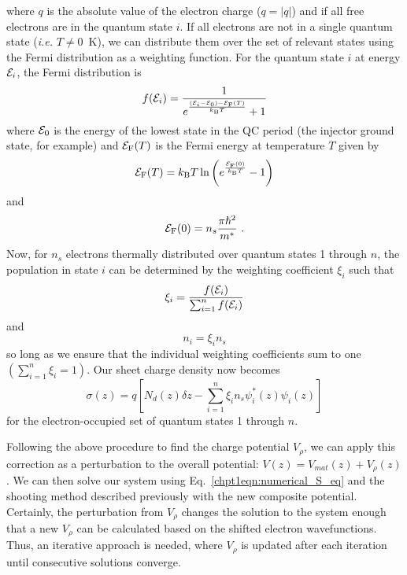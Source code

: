 \documentclass[12pt]{report}
\begin{document}
where $q$ is the absolute value of the electron charge ($q=|q|$) and if all free electrons are in the quantum state $i$.  If all electrons are not in a single quantum state (\emph{i.e.} $T\neq0$~K), we can distribute them over the set of relevant states using the Fermi distribution as a weighting function.  For the quantum state $i$ at energy $\EE_i$, the Fermi distribution is
\begin{equation}
f(\EE_i) = \frac{1}{e^{\frac{(\EE_i-\EE_0)-\EE_\tn{F}(T)}{k_\tn{B} T}}+1}
\end{equation}
where $\EE_0$ is the energy of the lowest state in the QC period (the injector ground state, for example) and $\EE_\tn{F}(T)$ is the Fermi energy at temperature $T$ given by \cite{Davies:book:1998}
\begin{equation}
\EE_\tn{F}(T)=k_\tn{B} T \ln\left(e^{\frac{\EE_\tn{F}(0)}{k_\tn{B} T}}-1\right)
\end{equation}
and
\begin{equation}
\EE_\tn{F}(0)=n_s \frac{\pi \hslash^2}{m^*} \text{~.}
\end{equation}
Now, for $n_s$ electrons thermally distributed over quantum states 1 through $n$, the population in state $i$ can be determined by the weighting coefficient $\xi_i$ such that
\begin{equation}
\xi_i = \frac{f(\EE_i)}{\sum_{i=1}^{n} f(\EE_i)}
\end{equation}
and
\begin{equation}
n_i=\xi_i n_s
\end{equation}
so long as we ensure that the individual weighting coefficients sum to one $\left(\sum_{i=1}^{n} \xi_i = 1\right)$.
Our sheet charge density now becomes
\begin{equation}
\sigma(z) = q \left[N_d(z) \delta\!z - \sum_{i=1}^{n} \xi_i n_s \psi_i^*(z) \psi_i(z) \right]
\end{equation}
for the electron-occupied set of quantum states 1 through $n$.

Following the above procedure to find the charge potential $V_\rho$, we can apply this correction as a perturbation to the overall potential: $V(z)=V_{mat}(z)+V_\rho(z)$.  We can then solve our system using Eq.~\eqref{chpt1eqn:numerical_S_eq} and the shooting method described previously with the new composite potential.  Certainly, the perturbation from $V_\rho$ changes the solution to the system enough that a new $V_\rho$ can be calculated based on the shifted electron wavefunctions.  Thus, an iterative approach is needed, where $V_\rho$ is updated after each iteration until consecutive solutions converge.
\end{document}
